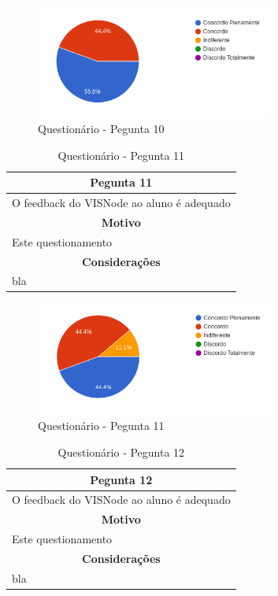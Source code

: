 \documentclass[
	12pt,				%
	oneside,			%
	a4paper,			%
	english,			%
	french,				%
	spanish,			%
	brazil,				%
	]{abntex2}
\begin{document}
\begin{figure}[H]
\centering
\caption{Questionário - Pegunta 10}
\includegraphics[width=0.7\textwidth]{imagens/v1/p10.png}
\sourceAuthor
\end{figure}

\begin{table}[H]
\centering
\caption{Questionário - Pegunta 11} 
\def\arraystretch{1.5}
\begin{tabular}{l}
\hline
\multicolumn{1}{c}{\textbf{Pegunta 11}}              \\ \hline
O feedback do VISNode ao aluno é adequado \\ \hline
\multicolumn{1}{c}{\textbf{Motivo}}                 \\ \hline
Este questionamento                                   \\ \hline
\multicolumn{1}{c}{\textbf{Considerações}}          \\ \hline
bla                                                   \\ \hline
\end{tabular}
\sourceAuthor
\end{table}

\begin{figure}[H]
\centering
\caption{Questionário - Pegunta 11}
\includegraphics[width=0.7\textwidth]{imagens/v1/p11.png}
\sourceAuthor
\end{figure}

\begin{table}[H]
\centering
\caption{Questionário - Pegunta 12} 
\def\arraystretch{1.5}
\begin{tabular}{l}
\hline
\multicolumn{1}{c}{\textbf{Pegunta 12}}              \\ \hline
O feedback do VISNode ao aluno é adequado \\ \hline
\multicolumn{1}{c}{\textbf{Motivo}}                 \\ \hline
Este questionamento                                   \\ \hline
\multicolumn{1}{c}{\textbf{Considerações}}          \\ \hline
bla                                                   \\ \hline
\end{tabular}
\sourceAuthor
\end{table}
\end{document}
